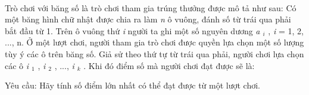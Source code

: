  

Trò chơi với băng số là trò chơi tham gia trúng thưởng được mô tả như sau: Có một băng hình chữ nhật được chia ra làm \emph{ n } ô vuông, đánh số từ trái qua phải bắt đầu từ 1. Trên ô vuông thứ \emph{ i } người ta ghi một số nguyên dương \emph{ a $_ i $} , \emph{ i } = 1, 2, ..., n. Ở một lượt chơi, người tham gia trò chơi được quyền lựa chọn một số lượng tùy ý các ô trên băng số. Giả sử theo thứ tự từ trái qua phải, người chơi lựa chọn các ô \emph{ i $_ 1 $} , \emph{ i $_ 2 $} , ..., \emph{ i $_ k $} . Khi đó điểm số mà người chơi đạt được sẽ là:

Yêu cầu: Hãy tính số điểm lớn nhất có thể đạt được từ một lượt chơi.

\